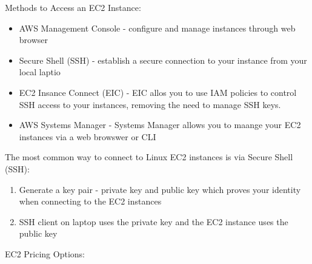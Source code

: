 \documentclass{article}%
\begin{document}
Methods to Access an EC2 Instance:
\begin{itemize}
    \item AWS Management Console - configure and manage instances through web browser
    \item Secure Shell (SSH) - establish a secure connection to your instance from your local laptio
    \item EC2 Insance Connect (EIC) - EIC allos you to use IAM policies to control SSH access to your instances, removing the need to manage SSH keys.
    \item AWS Systems Manager - Systems Manager allows you to maange your EC2 instances via a web browswer or CLI
\end{itemize}
The most common way to connect to Linux EC2 instances is via Secure Shell (SSH):
\begin{enumerate}
    \item Generate a key pair - private key and public key which proves your identity when connecting to the EC2 instances
    \item SSH client on laptop uses the private key and the EC2 instance uses the public key
\end{enumerate}
EC2 Pricing Options:
\end{document}
